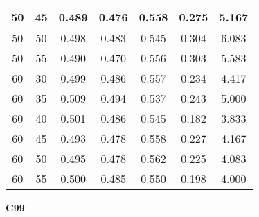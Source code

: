 \documentclass{article}
\begin{document}
\begin{longtable}[c]{|c|c|c|c|c|c|c|}
 50 & 45 & 0.489 & 0.476 & 0.558 & 0.275 & 5.167  \\ \hline 
 50 & 50 & 0.498 & 0.483 & 0.545 & 0.304 & 6.083  \\ \hline 
 50 & 55 & 0.490 & 0.470 & 0.556 & 0.303 & 5.583  \\ \hline 
 60 & 30 & 0.499 & 0.486 & 0.557 & 0.234 & 4.417  \\ \hline 
 60 & 35 & 0.509 & 0.494 & 0.537 & 0.243 & 5.000  \\ \hline 
 60 & 40 & 0.501 & 0.486 & 0.545 & 0.182 & 3.833  \\ \hline 
 60 & 45 & 0.493 & 0.478 & 0.558 & 0.227 & 4.167  \\ \hline 
 60 & 50 & 0.495 & 0.478 & 0.562 & 0.225 & 4.083  \\ \hline 
 60 & 55 & 0.500 & 0.485 & 0.550 & 0.198 & 4.000  \\ \hline 
 \end{longtable} 


 \newpage



{  
\large
\center
	\textbf{C99}  

}
\end{document}
